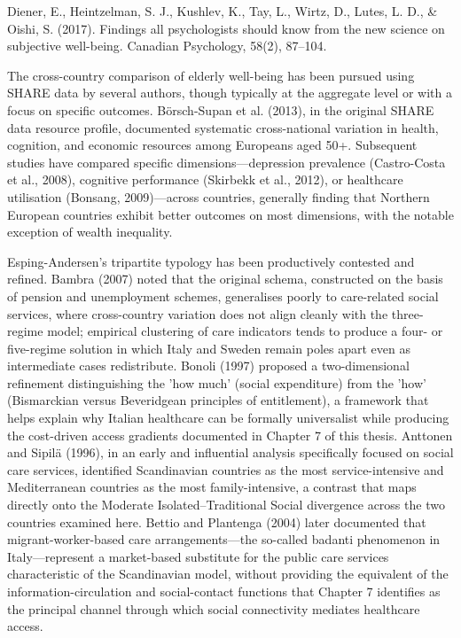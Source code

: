 Diener, E., Heintzelman, S. J., Kushlev, K., Tay, L., Wirtz, D., Lutes, L. D., \& Oishi, S. (2017). Findings all psychologists should know from the new science on subjective well-being. Canadian Psychology, 58(2), 87--104.

The cross-country comparison of elderly well-being has been pursued using SHARE data by several authors, though typically at the aggregate level or with a focus on specific outcomes. Börsch-Supan et al. (2013), in the original SHARE data resource profile, documented systematic cross-national variation in health, cognition, and economic resources among Europeans aged 50+. Subsequent studies have compared specific dimensions---depression prevalence (Castro-Costa et al., 2008), cognitive performance (Skirbekk et al., 2012), or healthcare utilisation (Bonsang, 2009)---across countries, generally finding that Northern European countries exhibit better outcomes on most dimensions, with the notable exception of wealth inequality.

Esping-Andersen's tripartite typology has been productively contested and refined. Bambra (2007) noted that the original schema, constructed on the basis of pension and unemployment schemes, generalises poorly to care-related social services, where cross-country variation does not align cleanly with the three-regime model; empirical clustering of care indicators tends to produce a four- or five-regime solution in which Italy and Sweden remain poles apart even as intermediate cases redistribute. Bonoli (1997) proposed a two-dimensional refinement distinguishing the 'how much' (social expenditure) from the 'how' (Bismarckian versus Beveridgean principles of entitlement), a framework that helps explain why Italian healthcare can be formally universalist while producing the cost-driven access gradients documented in Chapter 7 of this thesis. Anttonen and Sipilä (1996), in an early and influential analysis specifically focused on social care services, identified Scandinavian countries as the most service-intensive and Mediterranean countries as the most family-intensive, a contrast that maps directly onto the Moderate Isolated--Traditional Social divergence across the two countries examined here. Bettio and Plantenga (2004) later documented that migrant-worker-based care arrangements---the so-called badanti phenomenon in Italy---represent a market-based substitute for the public care services characteristic of the Scandinavian model, without providing the equivalent of the information-circulation and social-contact functions that Chapter 7 identifies as the principal channel through which social connectivity mediates healthcare access.

